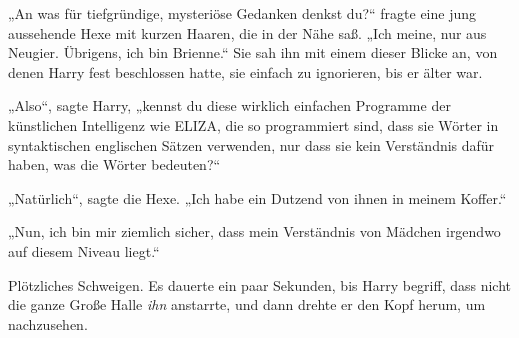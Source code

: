 „An was für tiefgründige, mysteriöse Gedanken denkst du?“ fragte eine jung aussehende Hexe mit kurzen Haaren, die in der Nähe saß.
„Ich meine, nur aus Neugier. Übrigens, ich bin Brienne.“
Sie sah ihn mit einem dieser Blicke an, von denen Harry fest beschlossen hatte, sie einfach zu ignorieren, bis er älter war.

„Also“, sagte Harry, „kennst du diese wirklich einfachen Programme der künstlichen Intelligenz wie ELIZA, die so programmiert sind, dass sie Wörter in syntaktischen englischen Sätzen verwenden, nur dass sie kein Verständnis dafür haben, was die Wörter bedeuten?“

„Natürlich“, sagte die Hexe.
„Ich habe ein Dutzend von ihnen in meinem Koffer.“

„Nun, ich bin mir ziemlich sicher, dass mein Verständnis von Mädchen irgendwo auf diesem Niveau liegt.“

Plötzliches Schweigen. Es dauerte ein paar Sekunden, bis Harry begriff, dass nicht die ganze Große Halle \emph{ihn} anstarrte, und dann drehte er den Kopf herum, um nachzusehen.


